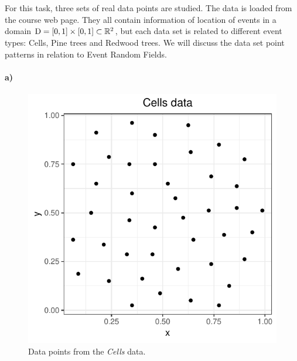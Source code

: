 \section{}
\label{sec:problem1}
For this task, three sets of real data points are studied. The data is loaded from the course web page. They all contain information of location of events in a domain $\textrm{D} = [0,1]\times[0,1] \subset \mathbb{R}^2$, but each data set is related to different event types: Cells, Pine trees and Redwood trees. We will discuss the data set point patterns in relation to Event Random Fields.

\paragraph{a)}

\begin{figure}
    \centering
    \includegraphics[scale=0.95]{figures/prob1_cells_points.pdf}
    \caption{Data points from the \textit{Cells} data.}
    \label{fig:cells_points}
\end{figure}

